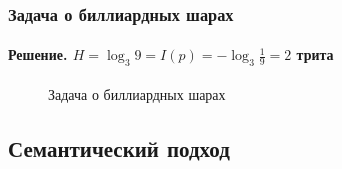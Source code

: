 \begin{frame}
\frametitle{Задача о биллиардных шарах}
\framesubtitle{Решение. $H=\log_{3}9=I(p)=-\log_{3}\frac{1}{9}=2$ трита}
\begin{figure}
    \begin{center}
    \end{center}
    \caption{Задача о биллиардных шарах}\label{pict:trit}
\end{figure} 
\end{frame}


\subsection{Семантический подход}

